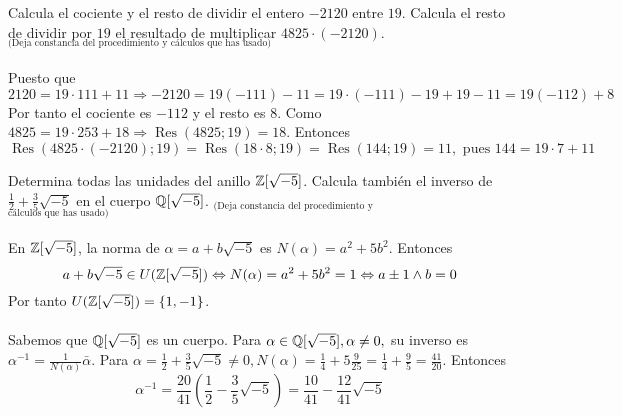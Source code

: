 \documentclass[12pt]{article}
\DeclareMathOperator{\Res}{Res}
\begin{document}
    \begin{ejercicio}[1.25 puntos]
        Calcula el cociente y el resto de dividir el entero $-2120$ entre $19$. Calcula el resto de dividir
        por $19$ el resultado de multiplicar $4825 \cdot (-2120)$. $_{\text{(Deja constancia del procedimiento y cálculos que has usado)}}$ \\ \\
        Puesto que 
        \begin{equation*}
            2120 = 19 \cdot 111 + 11 \Rightarrow -2120 = 19(-111) - 11 = 19 \cdot (-111) -19 + 19 -11 = 19(-112) + 8
        \end{equation*}
        Por tanto el cociente es $-112$ y el resto es $8$. Como $4825 = 19 \cdot 253 + 18 \Rightarrow \Res(4825; 19) = 18$. Entonces
        \begin{equation*}
            \Res(4825 \cdot (-2120); 19) = \Res(18 \cdot 8; 19) = \Res(144; 19) = 11, \text{ pues } 144 = 19 \cdot 7 +11
        \end{equation*}
    \end{ejercicio}
    \begin{ejercicio}[1.25 puntos]
        Determina todas las unidades del anillo ${\mathbb{Z}}[\sqrt{-5}]$. Calcula también el inverso de $\frac{1}{2} + \frac{3}{5}\sqrt{-5}$ en el cuerpo ${\mathbb{Q}}[\sqrt{-5}]$. $_{\text{(Deja constancia del procedimiento y }}$ \\  $_{\text{cálculos que has usado)}}$ \\ \\
        En ${\mathbb{Z}}[\sqrt{-5}]$, la norma de $\alpha = a + b \sqrt{-5}$ es $N(\alpha) = a^2 + 5b^2$. Entonces
        \begin{equation*}
            a+b\sqrt{-5} \in U({\mathbb{Z}}[\sqrt{-5}]) \Leftrightarrow N(\alpha) = a^2 + 5b^2 = 1 \Leftrightarrow a \pm 1 \land b=0
        \end{equation*}
        Por tanto $U({\mathbb{Z}}[\sqrt{-5}]) = \{1, -1\}$. \\ \\
        Sabemos que ${\mathbb{Q}}[\sqrt{-5}]$ es un cuerpo. Para $\alpha \in {\mathbb{Q}}[\sqrt{-5}], \alpha \neq 0,$ su inverso es $\alpha^{-1} = \frac{1}{N(\alpha)}\bar{\alpha}$. Para $\alpha = \frac{1}{2} + \frac{3}{5}\sqrt{-5} \neq 0, N(\alpha) = \frac{1}{4} + 5\frac{9}{25} = \frac{1}{4} + \frac{9}{5} = \frac{41}{20}$. Entonces
        \begin{equation*}
            \alpha^{-1} = \frac{20}{41}(\frac{1}{2} - \frac{3}{5}\sqrt{-5}) = \frac{10}{41} - \frac{12}{41}\sqrt{-5}
        \end{equation*}
    \end{ejercicio}
\end{document}
